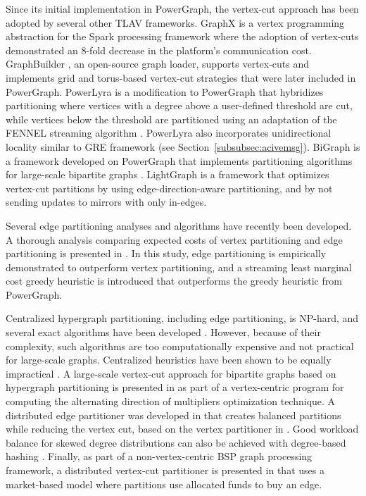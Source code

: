 \documentclass[reprint,twocolumn,showpacs,preprintnumbers,amsmath, aps,pre,amssymb]{revtex4-1}
\begin{document}
Since its initial implementation in PowerGraph, the vertex-cut approach has been adopted by several other TLAV frameworks.  GraphX is a vertex programming abstraction for the Spark processing framework \cite{Gonzalez2014,Zaharia2010} where the adoption of vertex-cuts demonstrated an 8-fold decrease in the platform's communication cost. GraphBuilder \cite{Jain2013}, an open-source graph loader, supports vertex-cuts and implements grid and torus-based vertex-cut strategies that were later included in PowerGraph.  PowerLyra \cite{Chen2013b} is a modification to PowerGraph that hybridizes partitioning where vertices with a degree above a user-defined threshold are cut, while vertices below the threshold are partitioned using an adaptation of the FENNEL streaming algorithm \cite{Tsourakakis2014}. PowerLyra also incorporates unidirectional locality similar to GRE framework (see Section~\ref{subsubsec:acivemsg}).  BiGraph is a framework developed on PowerGraph that implements partitioning algorithms for large-scale bipartite graphs \cite{Chen2014bi}.  LightGraph \cite{Zhao2014} is a framework that optimizes vertex-cut partitions by using edge-direction-aware partitioning, and by not sending updates to mirrors with only in-edges.

Several edge partitioning analyses and algorithms have recently been developed.  A thorough analysis comparing expected costs of vertex partitioning and edge partitioning is presented in \cite{Bourse2014}. In this study, edge partitioning is empirically demonstrated to outperform vertex partitioning, and a streaming least marginal cost greedy heuristic is introduced that outperforms the greedy heuristic from PowerGraph.  

Centralized hypergraph partitioning, including edge partitioning, is NP-hard, and several exact algorithms have been developed \cite{Biha2011,Kim2012,Hager2014,Sevim}. However, because of their complexity, such algorithms are too computationally expensive and not practical for large-scale graphs.  Centralized heuristics have been shown to be equally impractical \cite{Benlic2013}.  A large-scale vertex-cut approach for bipartite graphs based on hypergraph partitioning is presented in \cite{Miao2013} as part of a vertex-centric program for computing the alternating direction of multipliers optimization technique.  A distributed edge partitioner was developed in \cite{Rahimian2014} that creates balanced partitions while reducing the vertex cut, based on the vertex partitioner in \cite{Rahimian2013}.  Good workload balance for skewed degree distributions can also be achieved with degree-based hashing \cite{Xie2014}.  Finally, as part of a non-vertex-centric BSP graph processing framework, a distributed vertex-cut partitioner is presented in \cite{Guerrieri2014} that uses a market-based model where partitions use allocated funds to buy an edge.
\end{document}
